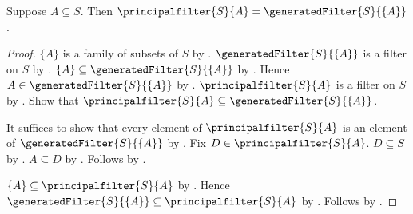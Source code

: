 \begin{theorem}\label{principalfilter_eq_generated_singleton}
    Suppose $A\subseteq S$.
    Then $\principalfilter{S}{A}=\generatedFilter{S}{\{A\}}$.
\end{theorem}
\begin{proof}
    $\{A\}$ is a family of subsets of $S$ by
        .
    $\generatedFilter{S}{\{A\}}$ is a filter on $S$ by
        .
    $\{A\}\subseteq\generatedFilter{S}{\{A\}}$ by
        .
    Hence $A\in\generatedFilter{S}{\{A\}}$ by
        .
    $\principalfilter{S}{A}$ is a filter on $S$ by
        .
    Show that $\principalfilter{S}{A}\subseteq
        \generatedFilter{S}{\{A\}}$.
    \begin{subproof}
        It suffices to show that every element of $\principalfilter{S}{A}$
            is an element of $\generatedFilter{S}{\{A\}}$
            by .
        Fix $D\in\principalfilter{S}{A}$.
        $D\subseteq S$ by .
        $A\subseteq D$ by .
        Follows by .
    \end{subproof}
    $\{A\}\subseteq\principalfilter{S}{A}$ by
        .
    Hence $\generatedFilter{S}{\{A\}}\subseteq
        \principalfilter{S}{A}$ by .
    Follows by .
\end{proof}
